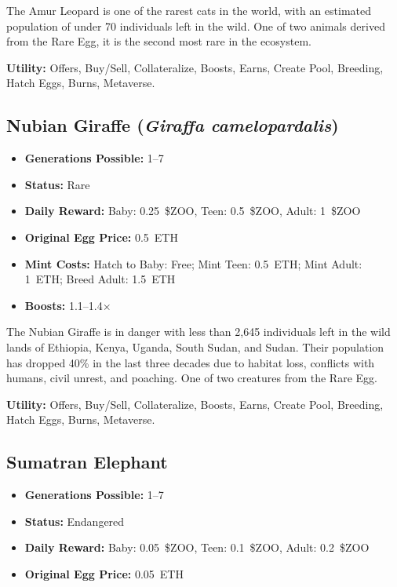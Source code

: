 The Amur Leopard is one of the rarest cats in the world, with an estimated population of under 70 individuals left in the wild. One of two animals derived from the Rare Egg, it is the second most rare in the ecosystem.

\textbf{Utility:} Offers, Buy/Sell, Collateralize, Boosts, Earns, Create Pool, Breeding, Hatch Eggs, Burns, Metaverse.

\subsection{Nubian Giraffe (\textit{Giraffa camelopardalis})}

\begin{itemize}[nosep]
\item \textbf{Generations Possible:} 1--7
\item \textbf{Status:} Rare
\item \textbf{Daily Reward:} Baby: 0.25~\$ZOO, Teen: 0.5~\$ZOO, Adult: 1~\$ZOO
\item \textbf{Original Egg Price:} 0.5~ETH
\item \textbf{Mint Costs:} Hatch to Baby: Free; Mint Teen: 0.5~ETH; Mint Adult: 1~ETH; Breed Adult: 1.5~ETH
\item \textbf{Boosts:} 1.1--1.4$\times$
\end{itemize}

The Nubian Giraffe is in danger with less than 2,645 individuals left in the wild lands of Ethiopia, Kenya, Uganda, South Sudan, and Sudan. Their population has dropped 40\% in the last three decades due to habitat loss, conflicts with humans, civil unrest, and poaching. One of two creatures from the Rare Egg.

\textbf{Utility:} Offers, Buy/Sell, Collateralize, Boosts, Earns, Create Pool, Breeding, Hatch Eggs, Burns, Metaverse.

\subsection{Sumatran Elephant}

\begin{itemize}[nosep]
\item \textbf{Generations Possible:} 1--7
\item \textbf{Status:} Endangered
\item \textbf{Daily Reward:} Baby: 0.05~\$ZOO, Teen: 0.1~\$ZOO, Adult: 0.2~\$ZOO
\item \textbf{Original Egg Price:} 0.05~ETH
\end{itemize}

